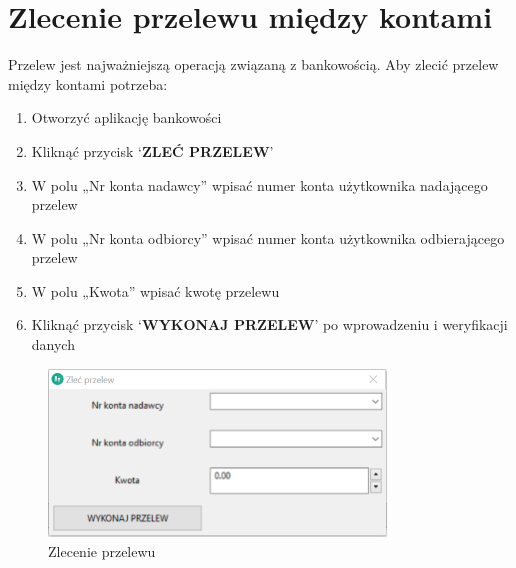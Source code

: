 \documentclass[a4paper,12pt]{article}
\begin{document}
	\section{Zlecenie przelewu między kontami}
	Przelew jest najważniejszą operacją związaną z bankowością. Aby zlecić przelew między kontami potrzeba:
\begin{enumerate}
	\item Otworzyć aplikację bankowości
	\item Kliknąć przycisk ‘\textbf{ZLEĆ PRZELEW}’
	\item W polu „Nr konta nadawcy” wpisać numer konta użytkownika nadającego przelew
	\item W polu „Nr konta odbiorcy” wpisać numer konta użytkownika odbierającego przelew
	\item W polu „Kwota” wpisać kwotę przelewu
	\item Kliknąć przycisk ‘\textbf{WYKONAJ PRZELEW}’ po wprowadzeniu i weryfikacji danych
\end{enumerate}

\begin{figure}[h]
	\centering
	\includegraphics[width=0.8\textwidth]{przelew.png}
	\caption{Zlecenie przelewu}
	\label{Przelew}
\end{figure}
\end{document}
